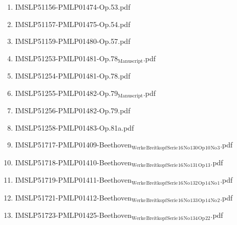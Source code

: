 \documentclass[11pt]{article}
\begin{document}
\begin{enumerate}
\begin{enumerate}
\begin{enumerate}
\item IMSLP51156-PMLP01474-Op.53.pdf
\label{sec-1-1-1-1-44-9-6-8-22}

\item IMSLP51157-PMLP01475-Op.54.pdf
\label{sec-1-1-1-1-44-9-6-8-23}

\item IMSLP51159-PMLP01480-Op.57.pdf
\label{sec-1-1-1-1-44-9-6-8-24}

\item IMSLP51253-PMLP01481-Op.78$_{\text{Manuscript}}$.pdf
\label{sec-1-1-1-1-44-9-6-8-25}

\item IMSLP51254-PMLP01481-Op.78.pdf
\label{sec-1-1-1-1-44-9-6-8-26}

\item IMSLP51255-PMLP01482-Op.79$_{\text{Manuscript}}$.pdf
\label{sec-1-1-1-1-44-9-6-8-27}

\item IMSLP51256-PMLP01482-Op.79.pdf
\label{sec-1-1-1-1-44-9-6-8-28}

\item IMSLP51258-PMLP01483-Op.81a.pdf
\label{sec-1-1-1-1-44-9-6-8-29}

\item IMSLP51717-PMLP01409-Beethoven$_{\text{Werke}}$$_{\text{Breitkopf}}$$_{\text{Serie}}$$_{\text{16}}$$_{\text{No}}$$_{\text{130}}$$_{\text{Op}}$$_{\text{10}}$$_{\text{No}}$$_{\text{3}}$.pdf
\label{sec-1-1-1-1-44-9-6-8-30}

\item IMSLP51718-PMLP01410-Beethoven$_{\text{Werke}}$$_{\text{Breitkopf}}$$_{\text{Serie}}$$_{\text{16}}$$_{\text{No}}$$_{\text{131}}$$_{\text{Op}}$$_{\text{13}}$.pdf
\label{sec-1-1-1-1-44-9-6-8-31}

\item IMSLP51719-PMLP01411-Beethoven$_{\text{Werke}}$$_{\text{Breitkopf}}$$_{\text{Serie}}$$_{\text{16}}$$_{\text{No}}$$_{\text{132}}$$_{\text{Op}}$$_{\text{14}}$$_{\text{No}}$$_{\text{1}}$.pdf
\label{sec-1-1-1-1-44-9-6-8-32}

\item IMSLP51721-PMLP01412-Beethoven$_{\text{Werke}}$$_{\text{Breitkopf}}$$_{\text{Serie}}$$_{\text{16}}$$_{\text{No}}$$_{\text{133}}$$_{\text{Op}}$$_{\text{14}}$$_{\text{No}}$$_{\text{2}}$.pdf
\label{sec-1-1-1-1-44-9-6-8-33}

\item IMSLP51723-PMLP01425-Beethoven$_{\text{Werke}}$$_{\text{Breitkopf}}$$_{\text{Serie}}$$_{\text{16}}$$_{\text{No}}$$_{\text{134}}$$_{\text{Op}}$$_{\text{22}}$.pdf
\label{sec-1-1-1-1-44-9-6-8-34}


\end{enumerate}
\end{enumerate}
\end{enumerate}
\end{document}
